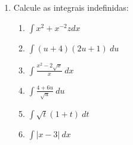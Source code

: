 \documentclass[a4paper,5pt]{amsbook}
\newcommand{\ds}{\displaystyle}
\begin{document}
\begin{enumerate}
    \vspace{0.5cm}
    \item Calcule as integrais indefinidas:
    \begin{enumerate}
        \item $\ds\int x^2+x^{-2}z dx$
        \vspace{0.3cm}
        \item $\ds\int (u+4)(2u+1)\ du$
        \vspace{0.3cm}
        \item $\ds\int \frac{x^2-2\sqrt{x}}{x}\ dx$
        \vspace{0.3cm}
        \item $\ds\int \frac{4+6u}{\sqrt{u}}\ du$
        \vspace{0.3cm}
        \item $\ds\int \sqrt{t}(1+t)\ dt$
        \vspace{0.3cm}
        \item $\ds\int |x-3|\ dx$
    \end{enumerate}
\end{enumerate}
\end{document}
